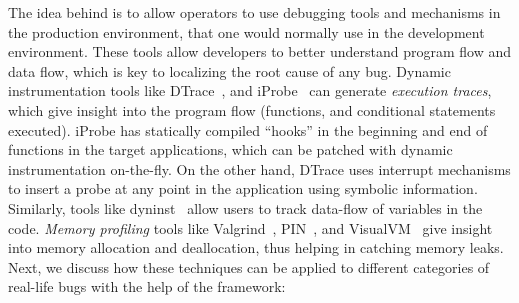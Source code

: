 The idea behind \parikshan is to allow operators to use debugging tools and mechanisms in the production environment, that one would normally use in the development environment.
These tools allow developers to better understand program flow and data flow, which is key to localizing the root cause of any bug.
Dynamic instrumentation tools like DTrace~\cite{dtrace}, and iProbe~\cite{iProbe} can generate \emph{execution traces}, which give insight into the program flow (functions, and conditional statements executed).
iProbe has statically compiled ``hooks'' in the beginning and end of functions in the target applications, which can be patched with dynamic instrumentation on-the-fly.
On the other hand, DTrace uses interrupt mechanisms to insert a probe at any point in the application using symbolic information. 
Similarly, tools like dyninst~\cite{dyninst} allow users to track data-flow of variables in the code.
\emph{Memory profiling} tools like Valgrind~\cite{valgrind}, PIN~\cite{pin}, and VisualVM~\cite{visualvm} give insight into memory allocation and deallocation, thus helping in catching memory leaks.
Next, we discuss how these techniques can be applied to different categories of real-life bugs with the help of the \parikshan framework:



